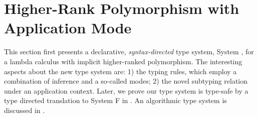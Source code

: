 \chapter{Higher-Rank Polymorphism with Application Mode}
\label{chap:BiDirectional}

This section first presents a declarative, \emph{syntax-directed} type system,
System \ap,
for a lambda calculus with implicit higher-ranked polymorphism. The interesting
aspects about the new type system are: 1) the typing rules, which employ a
combination of inference and a so-called \textit{\mode} modes; 2) the novel
subtyping relation under an application context. Later, we prove our type system
is type-safe by a type directed translation to System F in
. An algorithmic type system is discussed in
.




